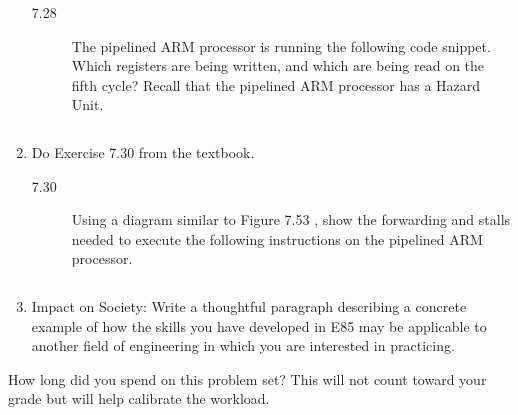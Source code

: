 \documentclass{ps}
\begin{document}
\begin{enumerate}
  \begin{description}
  \item[7.28] The pipelined ARM processor is running the following
    code snippet.  Which registers are being written, and which are
    being read on the fifth cycle?  Recall that the pipelined ARM
    processor has a Hazard Unit.

    \inputminted{text}{code/ddca-7.28.arm}

    \begin{solution}
    \end{solution}
  \end{description}

\item Do Exercise 7.30 from the textbook.

  \begin{description}
  \item[7.30] Using a diagram similar to Figure 7.53 \figurebelow,
    show the forwarding and stalls needed to execute the following
    instructions on the pipelined ARM processor.

    \inputminted{text}{code/ddca-7.30.arm}

    \begin{solution}
    \end{solution}
  \end{description}

\item Impact on Society: Write a thoughtful paragraph describing a
  concrete example of how the skills you have developed in E85 may be
  applicable to another field of engineering in which you are
  interested in practicing.

  \begin{solution}
  \end{solution}
\end{enumerate}

How long did you spend on this problem set?  This will not count
toward your grade but will help calibrate the workload.
\begin{solution}
\end{solution}
\end{document}
